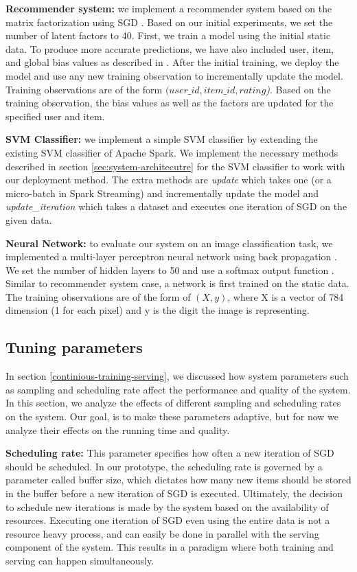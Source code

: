 \documentclass{vldb}
\begin{document}
\textbf{Recommender system:} we implement a recommender system based on the matrix factorization using SGD \cite{funk2006netflix}.
Based on our initial experiments, we set the number of latent factors to 40.
First, we train a model using the initial static data.
To produce more accurate predictions, we have also included user, item, and global bias values as described in \cite{koren2009matrix}.
After the initial training, we deploy the model and use any new training observation to incrementally update the model.
Training observations are of the form \textit{\((user\_id, item\_id, rating\))}.
Based on the training observation, the bias values as well as the factors are updated for the specified user and item.

\textbf{SVM Classifier:} we implement a simple SVM classifier by extending the existing SVM classifier of Apache Spark.
We implement the necessary methods described in section \ref{sec:system-architecutre} for the SVM classifier to work with our deployment method.
The extra methods are \textit{update} which takes one (or a micro-batch in Spark Streaming) and incrementally update the model and \textit{update\_iteration} which takes a dataset and executes one iteration of SGD on the given data.

\textbf{Neural Network:} to evaluate our system on an image classification task, we implemented a multi-layer perceptron neural network using back propagation \cite{collobert2004links}.
We set the number of hidden layers to 50 and use a softmax output function \cite{bishop2006pattern}.
Similar to recommender system case, a network is first trained on the static data.
The training observations are of the form of \textit{\((X,y)\)}, where X is a vector of 784 dimension (1 for each pixel) and y is the digit the image is representing.

\subsection{Tuning parameters} \label{tuning}
In section \ref{continious-training-serving}, we discussed how system parameters such as sampling and scheduling rate affect the performance and quality of the system.
In this section, we analyze the effects of different sampling and scheduling rates on the system.
Our goal, is to make these parameters adaptive, but for now we analyze their effects on the running time and quality. 

\textbf{Scheduling rate:} This parameter specifies how often a new iteration of SGD should be scheduled. 
In our prototype, the scheduling rate is governed by a parameter called buffer size, which dictates how many new items should be stored in the buffer before a new iteration of SGD is executed. 
Ultimately, the decision to schedule new iterations is made by the system based on the availability of resources. 
Executing one iteration of SGD even using the entire data is not a resource heavy process, and can easily be done in parallel with the serving component of the system. 
This results in a paradigm where both training and serving can happen simultaneously. 
\end{document}
